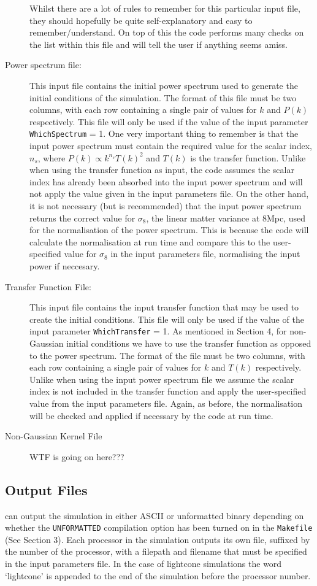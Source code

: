 \documentclass[12pt,twoside,a4paper]{article}
\begin{document}
\begin{description}
{Whilst there are a lot of rules to remember for this particular input file, they should hopefully be quite self-explanatory and easy to remember/understand. On top of this the code performs many checks on the list within this file and will tell the user if anything seems amiss.}
  \item[Power spectrum file:]{This input file contains the initial power spectrum used to generate the initial conditions of the simulation. The format of this file must be two columns, with each row containing a single pair of values for $k$ and $P(k)$ respectively. This file will only be used if the value of the input parameter \texttt{WhichSpectrum} = 1. One very important thing to remember is that the input power spectrum must contain the required value for the scalar index, $n_{s}$, where $P(k) \propto k^{n_{s}}T(k)^{2}$ and $T(k)$ is the transfer function. Unlike when using the transfer function as input, the code assumes the scalar index has already been absorbed into the input power spectrum and will not apply the value given in the input parameters file. On the other hand, it is not necessary (but is recommended) that the input power spectrum returns the correct value for $\sigma_{8}$, the linear matter variance at $8$Mpc, used for the normalisation of the power spectrum. This is because the code will calculate the normalisation at run time and compare this to the user-specified value for $\sigma_{8}$ in the input parameters file, normalising the input power if neccesary.}
  \item[Transfer Function File:]{This input file contains the input transfer function that may be used to create the initial conditions. This file will only be used if the value of the input parameter \texttt{WhichTransfer} = 1. As mentioned in Section 4, for non-Gaussian initial conditions we have to use the transfer function as opposed to the power spectrum. The format of the file must be two columns, with each row containing a single pair of values for $k$ and $T(k)$ respectively. Unlike when using the input power spectrum file we assume the scalar index is not included in the transfer function and apply the user-specified value from the input parameters file. Again, as before, the normalisation will be checked and applied if necessary by the code at run time.}
  \item[Non-Gaussian Kernel File]{WTF is going on here???}
\end{description}

\subsection{Output Files}
{\PICOLA} can output the simulation in either ASCII or unformatted binary depending on whether the \texttt{UNFORMATTED} compilation option has been turned on in the \texttt{Makefile} (See Section 3). Each processor in the simulation outputs its own file, suffixed by the number of the processor, with a filepath and filename that must be specified in the input parameters file. In the case of lightcone simulations the word `lightcone' is appended to the end of the simulation before the processor number. 
\end{document}
